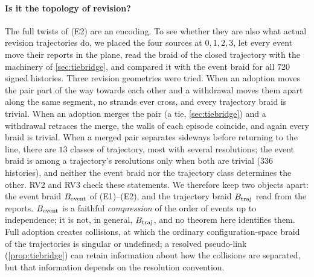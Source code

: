 \documentclass[11pt]{article}
\theoremstyle{definition}\newtheorem{definition}[theorem]{Definition}\newtheorem{remark}[theorem]{Remark}\newtheorem{example}[theorem]{Example}\newtheorem{problem}[theorem]{Open problem}\crefname{problem}{Problem}{Problems}
\begin{document}
\paragraph{Is it the topology of revision?} The full twists of (E2) are an encoding. To see whether they are also what actual revision trajectories do, we placed the four sources at $0,1,2,3$, let every event move their reports in the plane, read the braid of the closed trajectory with the machinery of \cref{sec:tiebridge}, and compared it with the event braid for all $720$ signed histories. Three revision geometries were tried. When an adoption moves the pair part of the way towards each other and a withdrawal moves them apart along the same segment, no strands ever cross, and every trajectory braid is trivial. When an adoption merges the pair (a tie, \cref{sec:tiebridge}) and a withdrawal retraces the merge, the walls of each episode coincide, and again every braid is trivial. When a merged pair separates sideways before returning to the line, there are $13$ classes of trajectory, most with several resolutions; the event braid is among a trajectory's resolutions only when both are trivial ($336$ histories), and neither the event braid nor the trajectory class determines the other. RV2 and RV3 check these statements. We therefore keep two objects apart: the event braid $B_{\rm event}$ of (E1)--(E2), and the trajectory braid $B_{\rm traj}$ read from the reports. $B_{\rm event}$ is a faithful \emph{compression} of the order of events up to independence; it is not, in general, $B_{\rm traj}$, and no theorem here identifies them. Full adoption creates collisions, at which the ordinary configuration-space braid of the trajectories is singular or undefined; a resolved pseudo-link (\cref{prop:tiebridge}) can retain information about how the collisions are separated, but that information depends on the resolution convention.
\end{document}
